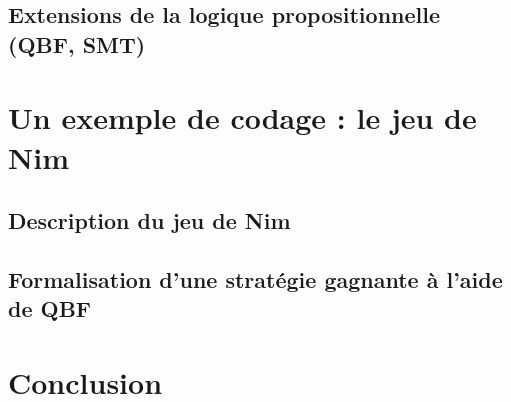 \documentclass[a4paper,12pt,oneside]{extbook}
\begin{document}
\subsection{Extensions de la logique propositionnelle (QBF, SMT)}

\section{Un exemple de codage : le jeu de Nim}
\subsection{Description du jeu de Nim}

\subsection{Formalisation d'une stratégie gagnante à l'aide de QBF}









\section{Conclusion}
\end{document}
